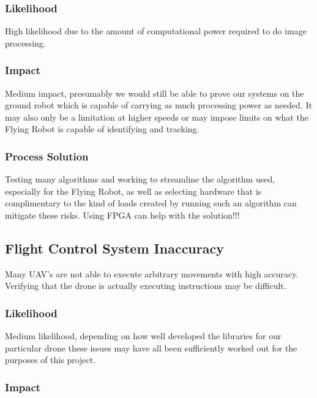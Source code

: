 \documentclass{article}
\begin{document}
		\subsubsection{Likelihood}

		High likelihood due to the amount of computational power required to do image processing. 
		
		\subsubsection{Impact}
		
		Medium impact, presumably we would still be able to prove our systems on the ground robot which is capable of carrying as much processing power as needed. It may also only be a limitation at higher speeds or may impose limits on what the Flying Robot is capable of identifying and tracking. 
		
		\subsubsection{Process Solution}
		
		Testing many algorithms and working to streamline the algorithm used, especially for the Flying Robot, as well as selecting hardware that is complimentary to the kind of loads created by running such an algorithm can mitigate these risks. Using FPGA can help with the solution!!!
	
	\subsection{Flight Control System Inaccuracy}
	
	Many UAV's are not able to execute arbitrary movements with high accuracy. Verifying that the drone is actually executing instructions may be difficult. 
	
		\subsubsection{Likelihood}
		
		Medium likelihood, depending on how well developed the libraries for our particular drone these issues may have all been sufficiently worked out for the purposes of this project.
		
		\subsubsection{Impact}
		
\end{document}
